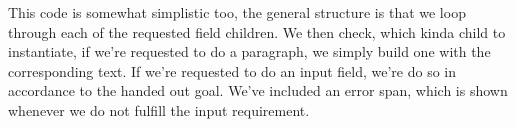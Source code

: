 This code is somewhat simplistic too, the general structure is that we loop through each of the requested field children.
We then check, which kinda child to instantiate, if we're requested to do a paragraph, we simply build one with the corresponding text.
If we're requested to do an input field, we're do so in accordance to the handed out goal.
We've included an error span, which is shown whenever we do not fulfill the input requirement.

